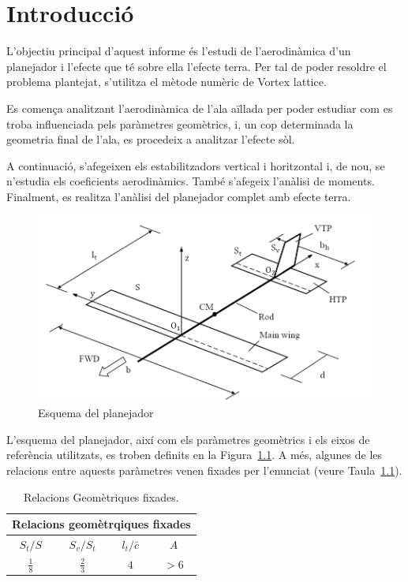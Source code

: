 \chapter{Introducció}

L'objectiu principal d'aquest informe és l'estudi de l'aerodinàmica d'un planejador i l'efecte que té sobre ella l'efecte terra. Per tal de poder resoldre el problema plantejat, s'utilitza el mètode numèric de Vortex lattice.

Es comença analitzant l'aerodinàmica de l'ala aïllada per poder estudiar com es troba influenciada pels paràmetres geomètrics, i, un cop determinada la geometria final de l'ala, es procedeix a analitzar l'efecte sòl.

A continuació, s'afegeixen els estabilitzadors vertical i horitzontal i, de nou, se n'estudia els coeficients aerodinàmics. També s'afegeix l'anàlisi de moments. Finalment, es realitza l'anàlisi del planejador complet amb efecte terra.

\begin{figure}[H]
	\centering
	\includegraphics[scale=0.5]{plots/enunciat.png}
	\caption{Esquema del planejador}
	\label{enunciat}
\end{figure}

L'esquema del planejador, així com els paràmetres geomètrics i els eixos de referència utilitzats, es troben definits en la Figura~\ref{enunciat}. A més, algunes de les relacions entre aquests paràmetres venen fixades per l'enunciat (veure Taula~\ref{tab:Dades}).

\begin{table} [H]
	\centering
	\caption{Relacions Geomètriques fixades.} \label{tab:Dades}
	\vspace{10pt}
	\begin{tabular}{| c | c | c | c |}	
		\hline
		\multicolumn{4}{|c|}{\bfseries Relacions geomètrqiques fixades} \\
		\hline\hline
	\textbf{$S_{t}/S$} & \textbf{$S_{v}/S_{t}$} & \textbf{$l_{t}/\bar{c}$} & \textbf{$A$}\\ \hline 
		$\frac{1}{8}$ & $\frac{2}{3}$ & $4$ & $>6$\\
		\hline	
	\end{tabular} 
\end{table}


